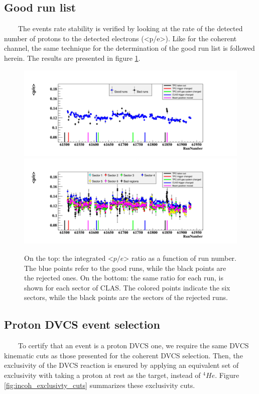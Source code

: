 \subsection{Good run list}
~~~~The events rate stability is verified by looking at the rate of the 
detected number of protons to the detected electrons (<p/e>). Like for the 
coherent channel, the same technique for the determination of the good run list 
is followed herein. The results are presented in figure 
\ref{fig:prot_over_e_Run_sec.png}.  \begin{figure}[h!]
\includegraphics[scale=0.4]{fig_dvcs/prot_over_e_Run.png}
\includegraphics[scale=0.4]{fig_dvcs/prot_over_e_Run_sec.png}
\caption{On the top: the integrated <$p/e$> ratio as a function of run number.  
   The blue points refer to the good runs, while the black points are the 
rejected ones. On the bottom: the same ratio for each run, is shown for each 
sector of CLAS. The colored points indicate the six sectors, while the black 
points are the sectors of the rejected runs. } 
\label{fig:prot_over_e_Run_sec.png}
\end{figure}


\subsection{Proton DVCS event selection}
~~~~To certify that an event is a proton DVCS one, we require the same DVCS 
kinematic cuts as those presented for the coherent DVCS selection. Then, the 
exclusivity of the DVCS reaction is ensured by applying an equivalent set of 
exclusivity with taking a proton at rest as the target, instead of $^4He$.  
Figure \ref{fig:incoh_exclusivty_cuts} summarizes these exclusivity cuts.\\

